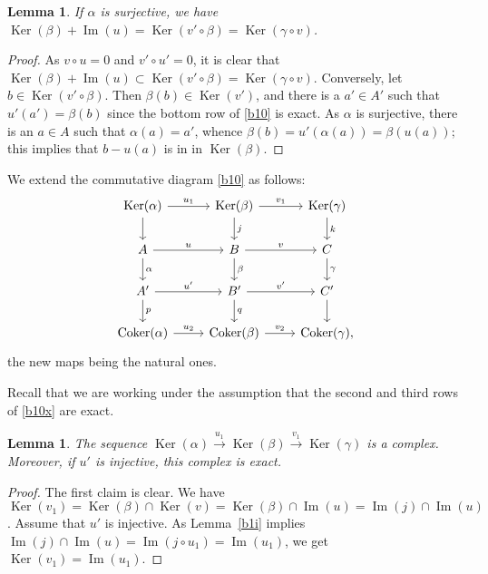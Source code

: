 \documentclass[12pt,letterpaper]{article}%
\newcommand{\oo}{\operatorname}\newcommand{\ooo}{\operatorname*}
\newcommand{\xr}{\xrightarrow}
\newtheorem{lem}[thm]{Lemma}
\begin{document}
\begin{lem}\label{b1ii}
If $\alpha$ is surjective, we have $\oo{Ker}(\beta)+\oo{Im}(u)=\oo{Ker}(v'\circ\beta)=\oo{Ker}(\gamma\circ v)$. 
\end{lem}

\begin{proof}
As $v\circ u=0$ and $v'\circ u'=0$, it is clear that $\oo{Ker}(\beta)+\oo{Im}(u)\subset\oo{Ker}(v'\circ\beta)=\oo{Ker}(\gamma\circ v)$. Conversely, let $b\in\oo{Ker}(v'\circ\beta)$. Then $\beta(b)\in\oo{Ker}(v')$, and there is a $a'\in A'$ such that $u'(a')=\beta(b)$ since the bottom row of \eqref{b10} is exact. As $\alpha$ is surjective, there is an $a\in A$ such that $\alpha(a)=a'$, whence 
$
\beta(b)=u'(\alpha(a))=\beta(u(a));
$ 
this implies that $b-u(a)$ is in in $\oo{Ker}(\beta)$.
\end{proof}

We extend the commutative diagram \eqref{b10} as follows:
\begin{equation}\label{b10x}
\begin{tikzcd}
\oo{Ker}(\alpha)\ar[d]\ar[r,"u_1"]&\oo{Ker}(\beta)\ar[d,"j"]\ar[r,"v_1"]&\oo{Ker}(\gamma)\ar[d,"k"]\\ 
A\ar[d,"\alpha"]\ar[r,"u"]&B\ar[d,"\beta"]\ar[r,"v"]&C\ar[d,"\gamma"]\\ 
A'\ar[d,"p"]\ar[r,"u'"]&B'\ar[d,"q"]\ar[r,"v'"]&C'\ar[d]\\ 
\oo{Coker}(\alpha)\ar[r,"u_2"]&\oo{Coker}(\beta)\ar[r,"v_2"]&\oo{Coker}(\gamma),
\end{tikzcd}
\end{equation} 
the new maps being the natural ones.

Recall that we are working under the assumption that the second and third rows of \eqref{b10x} are exact.

\begin{lem}\label{b2i}
The sequence $\oo{Ker}(\alpha)\xr{u_1}\oo{Ker}(\beta)\xr{v_1}\oo{Ker}(\gamma)$ is a complex. Moreover, if $u'$ is injective, this complex is exact.
\end{lem}
 
\begin{proof}
The first claim is clear. We have $\oo{Ker}(v_1)=\oo{Ker}(\beta)\cap\oo{Ker}(v)=\oo{Ker}(\beta)\cap\oo{Im}(u)=\oo{Im}(j)\cap\oo{Im}(u)$. Assume that $u'$ is injective. As Lemma~\ref{b1i} implies $\oo{Im}(j)\cap\oo{Im}(u)=\oo{Im}(j\circ u_1)=\oo{Im}(u_1)$, we get $\oo{Ker}(v_1)=\oo{Im}(u_1)$.
\end{proof}
\end{document}
